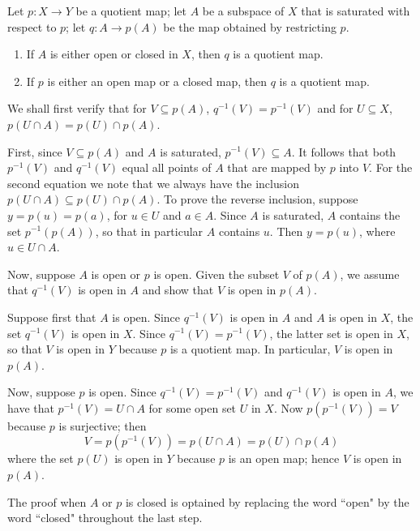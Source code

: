 \documentclass[12pt, a4paper, twoside, openright, titlepage]{book}
\begin{document}
\begin{thm}{}{}
    Let $p:X\rightarrow Y$ be a quotient map; let $A$ be a subspace of $X$ that is saturated with respect to $p$; let $q:A\rightarrow p(A)$ be the map obtained by restricting $p$. \begin{enumerate}
        \item If $A$ is either open or closed in $X$, then $q$ is a quotient map.
        \item If $p$ is either an open map or a closed map, then $q$ is a quotient map.
    \end{enumerate}
\end{thm}
\begin{proof*}{}{}
    We shall first verify that for $V \subseteq p(A)$, $q^{-1}(V) = p^{-1}(V)$ and for $U \subseteq X$, $p(U\cap A) = p(U)\cap p(A)$.

    First, since $V \subseteq p(A)$ and $A$ is saturated, $p^{-1}(V) \subseteq A$. It follows that both $p^{-1}(V)$ and $q^{-1}(V)$ equal all points of $A$ that are mapped by $p$ into $V$. For the second equation we note that we always have the inclusion $p(U\cap A) \subseteq p(U)\cap p(A)$. To prove the reverse inclusion, suppose $y = p(u) = p(a)$, for $u \in U$ and $a \in A$. Since $A$ is saturated, $A$ contains the set $p^{-1}(p(A))$, so that in particular $A$ contains $u$. Then $y = p(u)$, where $u \in U\cap A$.

    Now, suppose $A$ is open or $p$ is open. Given the subset $V$ of $p(A)$, we assume that $q^{-1}(V)$ is open in $A$ and show that $V$ is open in $p(A)$.

    Suppose first that $A$ is open. Since $q^{-1}(V)$ is open in $A$ and $A$ is open in $X$, the set $q^{-1}(V)$ is open in $X$. Since $q^{-1}(V) = p^{-1}(V)$, the latter set is open in $X$, so that $V$ is open in $Y$ because $p$ is a quotient map. In particular, $V$ is open in $p(A)$.

    Now, suppose $p$ is open. Since $q^{-1}(V) = p^{-1}(V)$ and $q^{-1}(V)$ is open in $A$, we have that $p^{-1}(V) = U\cap A$ for some open set $U$ in $X$. Now $p(p^{-1}(V)) = V$ because $p$ is surjective; then \begin{equation*}
        V = p(p^{-1}(V)) = p(U\cap A) = p(U)\cap p(A)
    \end{equation*}
    where the set $p(U)$ is open in $Y$ because $p$ is an open map; hence $V$ is open in $p(A)$.

    The proof when $A$ or $p$ is closed is optained by replacing the word ``open" by the word ``closed" throughout the last step.
\end{proof*}
\end{document}
